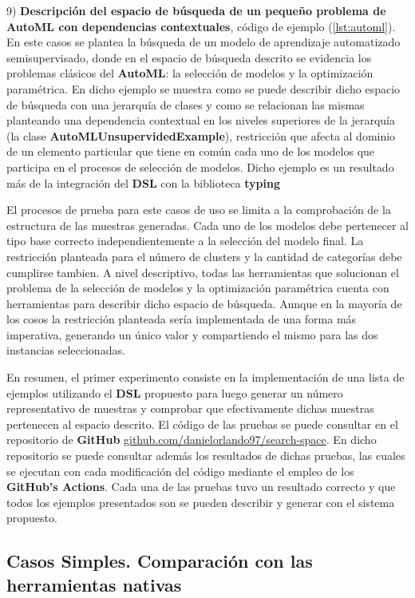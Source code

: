 9) {\bf Descripción del espacio de búsqueda de un pequeño problema de AutoML con dependencias contextuales}, código de ejemplo (\ref{lst:automl}). En este casos se plantea la
búsqueda de un modelo de aprendizaje automatizado semisupervisado, donde en el espacio de búsqueda descrito se evidencia los
problemas clásicos del {\bf AutoML}: la selección de modelos y la optimización paramétrica. En dicho ejemplo se muestra como se puede
describir dicho espacio de búsqueda con una jerarquía de clases y como se relacionan las mismas planteando una dependencia contextual
en los niveles superiores de la jerarquía (la clase {\bf AutoMLUnsupervidedExample}), restricción que afecta al dominio de un elemento
particular que tiene en común cada uno de los modelos que participa en el procesos de selección de modelos. Dicho ejemplo es un
resultado más de la integración del {\bf DSL} con la biblioteca {\bf typing}

El procesos de prueba para este casos de uso se limita a la comprobación de la estructura de las muestras generadas. Cada uno de
los modelos debe pertenecer al tipo base correcto independientemente a la
selección del modelo final. La restricción planteada para el número de clusters y la cantidad de categorías debe cumplirse tambien.
A nivel descriptivo, todas las herramientas que solucionan el problema de la selección de modelos y la optimización paramétrica
cuenta con herramientas para describir dicho espacio de búsqueda. Aunque en la mayoría de los cosos la restricción planteada sería
implementada de una forma más imperativa, generando un único valor y compartiendo el mismo para las dos instancias seleccionadas.

En resumen, el primer experimento consiste en la implementación de una lista de ejemplos utilizando el {\bf DSL} propuesto para luego generar
un número representativo de muestras y comprobar que efectivamente dichas muestras pertenecen al espacio descrito. El código de las
pruebas se puede consultar en el repositorio de {\bf GitHub} \href{https://github.com/danielorlando97/search-space}{github.com/danielorlando97/search-space}. 
En dicho repositorio se puede consultar además los
resultados de dichas pruebas, las cuales se ejecutan con cada modificación del código mediante el empleo de los {\bf GitHub's Actions}.
Cada una de las pruebas tuvo un resultado correcto y que todos los ejemplos presentados son se pueden describir y
generar con el sistema propuesto.

\subsection{Casos Simples. Comparación con las herramientas nativas}




